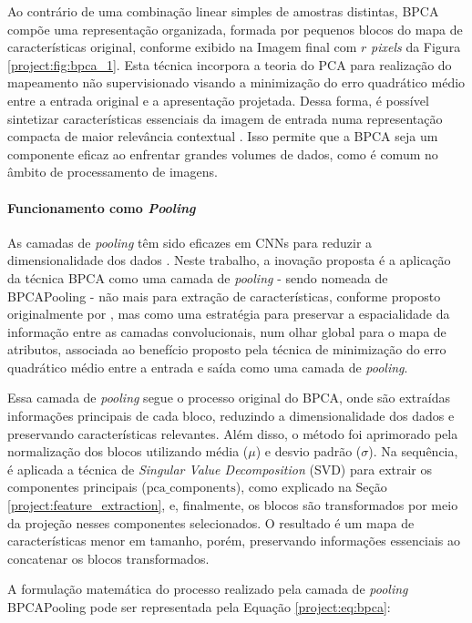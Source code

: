 Ao contrário de uma combinação linear simples de amostras distintas, BPCA compõe uma representação organizada, formada por pequenos blocos do mapa de características original, conforme exibido na Imagem final com $r$ \textit{pixels} da Figura \ref{project:fig:bpca_1}. Esta técnica incorpora a teoria do PCA para realização do mapeamento não supervisionado visando a minimização do erro quadrático médio entre a entrada original e a apresentação projetada. Dessa forma, é possível sintetizar características essenciais da imagem de entrada numa representação compacta de maior relevância contextual \citep{Kuncheva2014PCAData}. Isso permite que a BPCA seja um componente eficaz ao enfrentar grandes volumes de dados, como é comum no âmbito de processamento de imagens.

\paragraph{Funcionamento como \textit{Pooling}}
\label{project:bpca:pooling}
As camadas de \textit{pooling} têm sido eficazes em CNNs para reduzir a dimensionalidade dos dados \citep{Paul2019DimensionalityPooling}. Neste trabalho, a inovação proposta é a aplicação da técnica BPCA como uma camada de \textit{pooling} - sendo nomeada de BPCAPooling - não mais para extração de características, conforme proposto originalmente por \cite{Salvadeo2011}, mas como uma estratégia para preservar a espacialidade da informação entre as camadas convolucionais, num olhar global para o mapa de atributos, associada ao benefício proposto pela técnica de minimização do erro quadrático médio entre a entrada e saída como uma camada de \textit{pooling}.

Essa camada de \textit{pooling} segue o processo original do BPCA, onde são extraídas informações principais de cada bloco, reduzindo a dimensionalidade dos dados e preservando características relevantes. Além disso, o método foi aprimorado pela normalização dos blocos utilizando média ($\mu$) e desvio padrão ($\sigma$). Na sequência, é aplicada a técnica de \textit{Singular Value Decomposition} (SVD) para extrair os componentes principais ($\text{{pca\_components}}$), como explicado na Seção \ref{project:feature_extraction}, e, finalmente, os blocos são transformados por meio da projeção nesses componentes selecionados. O resultado é um mapa de características menor em tamanho, porém, preservando informações essenciais ao concatenar os blocos transformados.

A formulação matemática do processo realizado pela camada de \textit{pooling} BPCAPooling pode ser representada pela Equação \ref{project:eq:bpca}:

